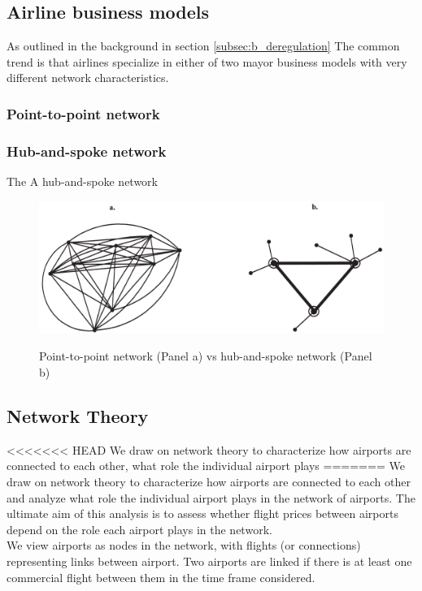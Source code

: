 \label{sec:theory}

\subsection{Airline business models}
As outlined in the background in section \ref{subsec:b_deregulation} The common trend is that airlines specialize in either of two mayor business models with very different network characteristics.

\subsubsection{Point-to-point network}


\subsubsection{Hub-and-spoke network}
The
A hub-and-spoke network




\begin{figure}[H]
  \centering
  \caption{Point-to-point network (Panel a) vs hub-and-spoke network (Panel b)}
    \includegraphics[width=1. \textwidth]{03_figures/Bryan_1999_networks}
  \label{fig:Bryan1999}
\end{figure}



\subsection{Network Theory}
\label{subsec:Network Theory}
<<<<<<< HEAD
We draw on network theory to characterize how airports are connected to each other, what role the individual airport plays
=======
We draw on network theory to characterize how airports are connected to each other and analyze what role the individual airport plays in the network of airports. The ultimate aim of this analysis is to assess whether flight prices between airports depend on the role each airport plays in the network. \\
We view airports as nodes in the network, with flights (or connections) representing links between airport. Two airports are linked if there is at least one commercial flight between them in the time frame considered. \\

